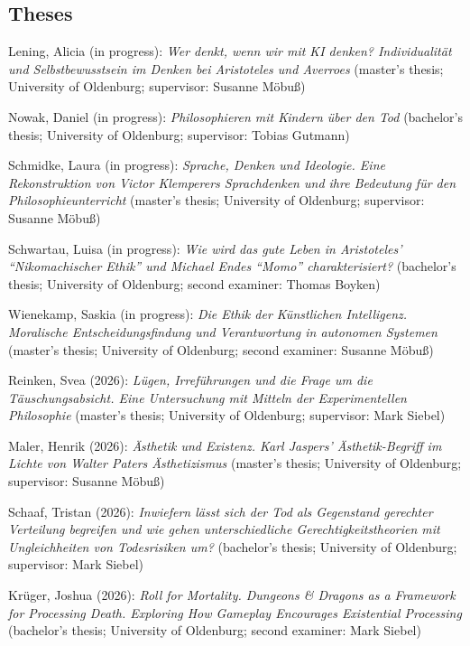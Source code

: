\documentclass[a4paper,10pt]{article}
\newenvironment{literature}{%
   \parskip6pt\parindent0pt\raggedright
   \def\lititem{\hangindent=1cm\hangafter1}}{%
   \par\ignorespaces}
\begin{document}
\subsection*{Theses}
\begin{literature}
\lititem Lening, Alicia (in progress): \textit{Wer denkt, wenn wir mit KI denken? Individualität und Selbstbewusstsein im Denken bei Aristoteles und Averroes} (master's thesis; University of Oldenburg; supervisor: Susanne Möbuß)

\lititem Nowak, Daniel (in progress): \textit{Philosophieren mit Kindern über den Tod} (bachelor's thesis; University of Oldenburg; supervisor: Tobias Gutmann)

\lititem Schmidke, Laura (in progress): \textit{Sprache, Denken und Ideologie. Eine Rekonstruktion von Victor Klemperers Sprachdenken und ihre Bedeutung für den Philosophieunterricht} (master's thesis; University of Oldenburg; supervisor: Susanne Möbuß)

\lititem Schwartau, Luisa (in progress): \textit{Wie wird das gute Leben in Aristoteles' \enquote{Nikomachischer Ethik} und Michael Endes \enquote{Momo} charakterisiert?} (bachelor's thesis; University of Oldenburg; second examiner: Thomas Boyken)

\lititem Wienekamp, Saskia (in progress): \textit{Die Ethik der Künstlichen Intelligenz. Moralische Entscheidungsfindung und Verantwortung in autonomen Systemen} (master's thesis; University of Oldenburg; second examiner: Susanne Möbuß)

\lititem Reinken, Svea (2026): \textit{Lügen, Irreführungen und die Frage um die Täuschungsabsicht. Eine Untersuchung mit Mitteln der Experimentellen Philosophie} (master's thesis; University of Oldenburg; supervisor: Mark Siebel)

\lititem Maler, Henrik (2026): \textit{Ästhetik und Existenz. Karl Jaspers' Ästhetik-Begriff im Lichte von Walter Paters Ästhetizismus} (master's thesis; University of Oldenburg; supervisor: Susanne Möbuß)

\lititem Schaaf, Tristan (2026): \textit{Inwiefern lässt sich der Tod als Gegenstand gerechter Verteilung begreifen und wie gehen unterschiedliche Gerechtigkeitstheorien mit Ungleichheiten von Todesrisiken um?} (bachelor's thesis; University of Oldenburg; supervisor: Mark Siebel)

\lititem Krüger, Joshua (2026): \textit{Roll for Mortality. \textit{Dungeons \& Dragons} as a Framework for Processing Death. Exploring How Gameplay Encourages Existential Processing} (bachelor's thesis; University of Oldenburg; second examiner: Mark Siebel)


\end{literature}
\end{document}
